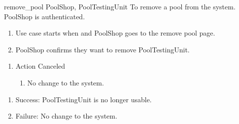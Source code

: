 \usecase
{remove\_pool}
{PoolShop, PoolTestingUnit}
{To remove a pool from the system.}
{PoolShop is authenticated.}
{
\begin{enumerate}
\item Use case starts when and PoolShop goes to the remove pool page.
\item PoolShop confirms they want to remove PoolTestingUnit.
\end{enumerate}
}
{
\begin{enumerate}
\item Action Canceled
\begin{enumerate}
\item No change to the system.
\end{enumerate}
\end{enumerate}
}
{
\begin{enumerate}
\item Success: PoolTestingUnit is no longer usable.
\item Failure: No change to the system.
\end{enumerate}
}


